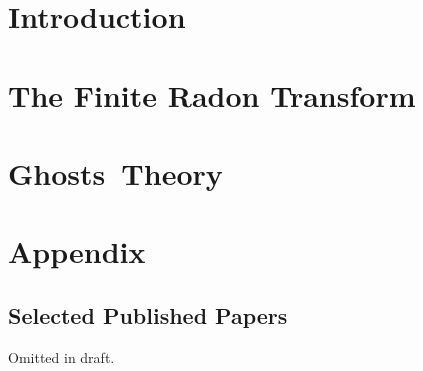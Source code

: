\documentclass[a4paper,11pt,final,openright,twoside]{memoir}
\date{\yearonly\today}
\begin{document}

\frontmatter %
\small



\mainmatter %
\normalsize
\part{Introduction}
%
%
%
%

\part{The Finite Radon Transform}
%

%

\part{Ghosts~Theory}
%

\part{Appendix}
\appendix %
\small
%
\chapter{Selected Published Papers}
	Omitted in draft.

\backmatter %


\citeindexfalse %
\setlength{\bibsep}{1pt}    %

\end{document}
